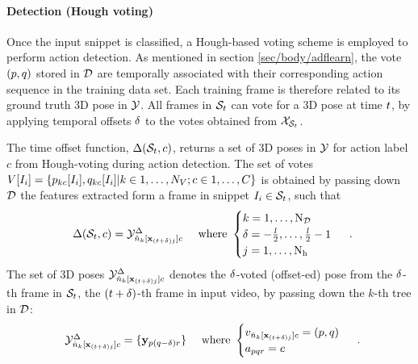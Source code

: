 \paragraph{Detection (Hough voting)}
Once the input snippet is classified, a Hough-based voting scheme is employed to perform action detection. 
As mentioned in section \ref{sec/body/adflearn}, the vote $(p,q)$ stored in $\mathcal{D}$ are temporally associated with their corresponding action sequence in the training data set. Each training frame is therefore related to its ground truth 3D pose in $\mathcal{Y}$. All frames in $\mathcal{S}_{t}$ can vote for a 3D pose at time $t$, by applying temporal offsets $\delta$ to the votes obtained from $\mathcal{X}_{\mathcal{S}_{t}}$. 

The time offset function, $\Delta(\mathcal{S}_{t},c)$, returns a set of 3D poses in $\mathcal{Y}$ for action label $c$ from Hough-voting during action detection. 
The set of votes $V[I_i] = \{ p_{k c}[I_{i}], q_{k c}[I_{i}]|k\in1,\dots,N_{V};c\in1,\dots,C\}$ is obtained by passing down $\mathcal{D}$ the features extracted form a frame in snippet $I_{i} \in \mathcal{S}_{t}$, such that 
\begin{equation} 
	\begin{array}{lr}
		\Delta(\mathcal{S}_{t}, c) = \mathcal{Y}^{\Delta}_{{\hat{n}}_{k}[\mathbf{x}_{(t+\delta)j}]c}
		& \mbox{ where } 
		\begin{cases}
			k = 1,\dots,\mathrm{N_{\mathcal{D}}} \\ 
			\delta = -\frac{l}{2},\dots,\frac{l}{2}-1\\ 
			j = 1,\dots,\mathrm{N_{h}}  
		\end{cases}
	\end{array}.
\end{equation}
The set of 3D poses $\mathcal{Y}^{\Delta}_{{\hat{n}}_{k}[\mathbf{x}_{(t+\delta)j}]c}$ denotes the $\delta$-voted (offset-ed) pose from the $\delta$-th frame in $\mathcal{S}_{t}$, \ie the $(t + \delta)$-th frame in input video, by passing down the $k$-th tree in $\mathcal{D}$:
\begin{equation}
	\begin{array}{lr}
		\mathcal{Y}^{\Delta}_{{\hat{n}}_{k}[\mathbf{x}_{(t+\delta)j}]c} = \{\mathbf{y}_{p(q-\delta)r}\}
		& \mbox{ where }
		\begin{cases}
			v_{{\hat{n}}_{k}[\mathbf{x}_{(t+\delta)j}]c} = (p, q) \\ 
			a_{pqr} = c 
		\end{cases}
	\end{array}.
\end{equation} 
